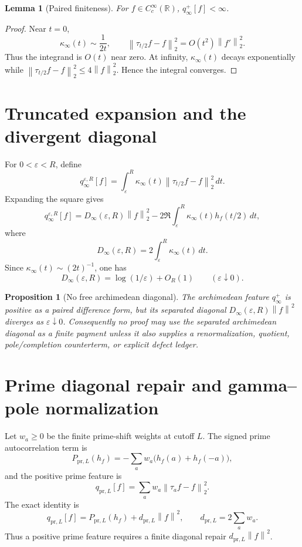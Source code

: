 \documentclass[11pt]{article}
\newtheorem{lemma}{Lemma}
\newtheorem{proposition}{Proposition}
\newcommand{\R}{\mathbb R}
\newcommand{\norm}[1]{\left\lVert #1\right\rVert}
\newcommand{\pr}{\mathrm{pr}}
\begin{document}
\begin{lemma}[Paired finiteness]
For $f\in C_c^\infty(\R)$, $q_\infty^+[f]<\infty$.
\end{lemma}
\begin{proof}
Near $t=0$,
\[
  \kappa_\infty(t)\sim \frac{1}{2t},
  \qquad
  \norm{\tau_{t/2}f-f}_2^2=O(t^2)\norm{f'}_2^2.
\]
Thus the integrand is $O(t)$ near zero. At infinity, $\kappa_\infty(t)$ decays exponentially while
$\norm{\tau_{t/2}f-f}_2^2\le4\norm f_2^2$. Hence the integral converges.
\end{proof}

\section{Truncated expansion and the divergent diagonal}
For $0<\varepsilon<R$, define
\[
  q_{\infty}^{\varepsilon,R}[f]
  =\int_\varepsilon^R\kappa_\infty(t)\norm{\tau_{t/2}f-f}_2^2\,dt.
\]
Expanding the square gives
\[
  q_{\infty}^{\varepsilon,R}[f]
  =D_\infty(\varepsilon,R)\norm f_2^2
  -2\Re\int_\varepsilon^R \kappa_\infty(t)h_f(t/2)\,dt,
\]
where
\[
  D_\infty(\varepsilon,R)=2\int_\varepsilon^R\kappa_\infty(t)\,dt.
\]
Since $\kappa_\infty(t)\sim(2t)^{-1}$, one has
\[
  D_\infty(\varepsilon,R)=\log(1/\varepsilon)+O_R(1)
  \qquad(\varepsilon\downarrow0).
\]

\begin{proposition}[No free archimedean diagonal]
The archimedean feature $q_\infty^+$ is positive as a paired difference form, but its separated diagonal $D_\infty(\varepsilon,R)\norm f^2$ diverges as $\varepsilon\downarrow0$. Consequently no proof may use the separated archimedean diagonal as a finite payment unless it also supplies a renormalization, quotient, pole/completion counterterm, or explicit defect ledger.
\end{proposition}

\section{Prime diagonal repair and gamma--pole normalization}
Let $w_a\ge0$ be the finite prime-shift weights at cutoff $L$. The signed prime autocorrelation term is
\[
  P_{\pr,L}(h_f)=-\sum_a w_a\bigl(h_f(a)+h_f(-a)\bigr),
\]
and the positive prime feature is
\[
  q_{\pr,L}[f]=\sum_a w_a\norm{\tau_a f-f}_2^2.
\]
The exact identity is
\[
  q_{\pr,L}[f]=P_{\pr,L}(h_f)+d_{\pr,L}\norm f^2,
  \qquad
  d_{\pr,L}=2\sum_a w_a.
\]
Thus a positive prime feature requires a finite diagonal repair $d_{\pr,L}\norm f^2$.
\end{document}
